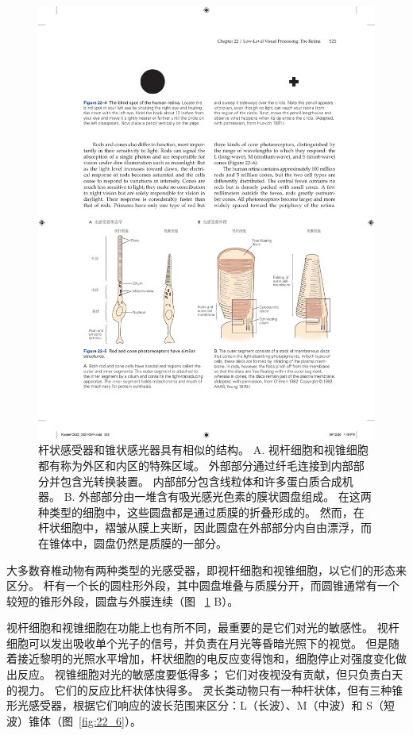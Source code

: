 \begin{figure}[htbp]
	\centering
	\includegraphics[width=1.0\linewidth]{chap22/fig_22_5}
	\caption{杆状感受器和锥状感光器具有相似的结构。
		A. 视杆细胞和视锥细胞都有称为外区和内区的特殊区域。
		外部部分通过纤毛连接到内部部分并包含光转换装置。
		内部部分包含线粒体和许多蛋白质合成机器。
		B. 外部部分由一堆含有吸光感光色素的膜状圆盘组成。
		在这两种类型的细胞中，这些圆盘都是通过质膜的折叠形成的。
		然而，在杆状细胞中，褶皱从膜上夹断，因此圆盘在外部部分内自由漂浮，而在锥体中，圆盘仍然是质膜的一部分\cite{o1982chemistry,young1970visual}。}
	\label{fig:22_5}
\end{figure}


大多数脊椎动物有两种类型的光感受器，即视杆细胞和视锥细胞，以它们的形态来区分。
杆有一个长的圆柱形外段，其中圆盘堆叠与质膜分开，而圆锥通常有一个较短的锥形外段，圆盘与外膜连续（图 ~\ref{fig:22_5} B）。


视杆细胞和视锥细胞在功能上也有所不同，最重要的是它们对光的敏感性。
视杆细胞可以发出吸收单个光子的信号，并负责在月光等昏暗光照下的视觉。
但是随着接近黎明的光照水平增加，杆状细胞的电反应变得饱和，细胞停止对强度变化做出反应。 
视锥细胞对光的敏感度要低得多；
它们对夜视没有贡献，但只负责白天的视力。
它们的反应比杆状体快得多。
灵长类动物只有一种杆状体，但有三种锥形光感受器，根据它们响应的波长范围来区分：L（长波）、M（中波）和 S（短波）锥体（图~\ref{fig:22_6}）。


